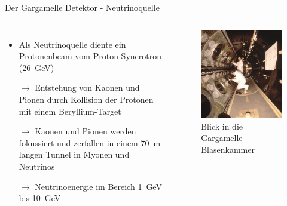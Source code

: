 \documentclass[aspectratio=1610, professionalfonts, 10pt]{beamer}
\begin{document}
\begin{frame}{Der Gargamelle Detektor - Neutrinoquelle}
	\begin{columns}
				\begin{itemize}
					\setlength\itemsep{0.5em}
					\item Als Neutrinoquelle diente ein Protonenbeam vom Proton Syncrotron (\SI{26}{\giga\electronvolt})
					\item[$\rightarrow$] Entstehung von Kaonen und Pionen durch Kollision der Protonen mit einem Beryllium-Target
					\item[$\rightarrow$] Kaonen und Pionen werden fokussiert und zerfallen in einem \SI{70}{\metre} langen Tunnel in Myonen und Neutrinos
					\item[$\rightarrow$] Neutrinoenergie im Bereich \SI{1}{\giga\electronvolt} bis \SI{10}{\giga\electronvolt}
				\end{itemize}

			\begin{figure}
	  			\centering
				\includegraphics[width=\linewidth]{Images/7011042-A5-at-72-dpi.jpg}
	  			\caption{Blick in die Gargamelle Blasenkammer \cite{CERN-EX-7011042}}
	  			\label{fig:feynman}
			\end{figure}
	\end{columns}
\end{frame}
\end{document}
